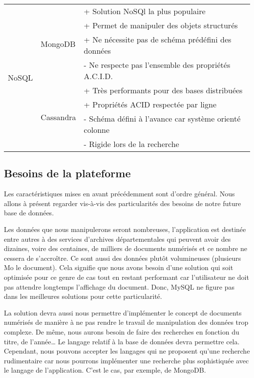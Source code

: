\begin{center}
\begin{tabular}{|l|l|l|}
            \multirow{8}{*}{NoSQL} & \multirow{4}{*}{MongoDB} & + Solution NoSQl la plus populaire \\
            & & + Permet de manipuler des objets structurés \\
            & & + Ne nécessite pas de schéma prédéfini des données \\
            & & - Ne respecte pas l’ensemble des propriétés A.C.I.D. \\ \cline{2-3}
            & \multirow{4}{*}{Cassandra} & + Très performants pour des bases distribuées \\
            & & + Propriétés ACID respectée par ligne \\
            & & - Schéma défini à l’avance car système orienté colonne \\
            & & - Rigide lors de la recherche \\
            \hline
        \end{tabular}
        \end{center}

    \subsection{Besoins de la plateforme}
    \label{subsec:besoinplateforme}
    Les caractéristiques mises en avant précédemment sont d’ordre général. Nous allons à présent regarder vis-à-vis des particularités des besoins de notre future base de données.
        
    Les données que nous manipulerons seront nombreuses, l’application est destinée entre autres à des services d’archives départementales qui peuvent avoir des dizaines, voire des centaines, de milliers de documents numérisés et ce nombre ne cessera de s'accroître. Ce sont aussi des données plutôt volumineuses (plusieurs Mo le document). Cela signifie que nous avons besoin d’une solution qui soit optimisée pour ce genre de cas tout en restant performant car l’utilisateur ne doit pas attendre longtemps l’affichage du document. Donc, MySQL ne figure pas dans les meilleures solutions pour cette particularité.
        
    La solution devra aussi nous permettre d’implémenter le concept de documents numérisés de manière à ne pas rendre le travail de manipulation des données trop complexe. De même, nous aurons besoin de faire des recherches en fonction du titre, de l’année… Le langage relatif à la base de données devra permettre cela. Cependant, nous pouvons accepter les langages qui ne proposent qu’une recherche rudimentaire car nous pourrons implémenter une recherche plus sophistiquée avec le langage de l’application. C’est le cas, par exemple, de MongoDB.
        
